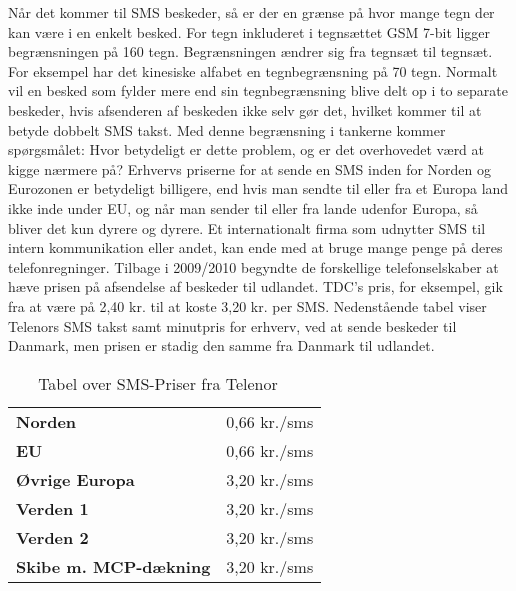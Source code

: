 Når det kommer til SMS beskeder, så er der en grænse på hvor mange tegn der kan være i en enkelt besked. For tegn inkluderet i tegnsættet GSM 7-bit ligger begrænsningen på 160 tegn. Begrænsningen ændrer sig fra tegnsæt til tegnsæt. For eksempel har det kinesiske alfabet en tegnbegrænsning på 70 tegn\cite{Pro_1}. Normalt vil en besked som fylder mere end sin tegnbegrænsning blive delt op i to separate beskeder, hvis afsenderen af beskeden ikke selv gør det, hvilket kommer til at betyde dobbelt SMS takst. Med denne begrænsning i tankerne kommer spørgsmålet: Hvor betydeligt er dette problem, og er det overhovedet værd at kigge nærmere på?
Erhvervs priserne for at sende en SMS inden for Norden og Eurozonen er betydeligt billigere, end hvis man sendte til eller fra et Europa land ikke inde under EU, og når man sender til eller fra lande udenfor Europa, så bliver det kun dyrere og dyrere. Et internationalt firma som udnytter SMS til intern kommunikation eller andet, kan ende med at bruge mange penge på deres telefonregninger. Tilbage i 2009/2010 begyndte de forskellige telefonselskaber at hæve prisen på afsendelse af beskeder til udlandet. TDC's pris, for eksempel, gik fra at være på 2,40 kr. til at koste 3,20 kr. per SMS\cite{Pro_2}. Nedenstående tabel viser Telenors SMS takst samt minutpris for erhverv, ved at sende beskeder til Danmark, men prisen er stadig den samme fra Danmark til udlandet\cite{Pro_3_1}.

\begin{table}[H]
\begin{center}
\begin{tabular}{ | l | r |}
    \hline
    \cellcolor{ForestGreen} &  \cellcolor{ForestGreen}\color{white}{\textbf{Sende/Modtage SMS}}\\[2ex] \hline
    \textbf{Norden} & 0,66 kr./sms \\ \hline
    \textbf{EU} & 0,66 kr./sms \\ \hline
    \textbf{Øvrige Europa} & 3,20 kr./sms \\ \hline
    \textbf{Verden 1} & 3,20 kr./sms \\ \hline
    \textbf{Verden 2} & 3,20 kr./sms \\ \hline
    \textbf{Skibe m. MCP-dækning} & 3,20 kr./sms \\ \hline
\end{tabular} 
\caption{Tabel over SMS-Priser fra Telenor ~\cite{Pro_3_2}}
\end{center}
\end{table}


